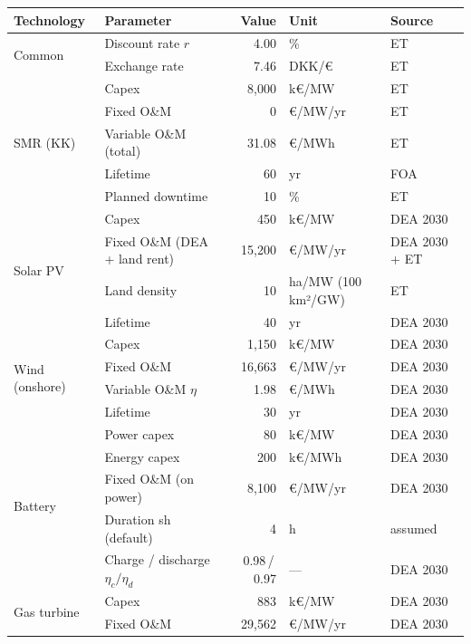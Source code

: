 \documentclass[10.5pt]{article}
\begin{document}
{\footnotesize
\begin{tabularx}{\linewidth}{l >{\raggedright\arraybackslash}X r l l}
\toprule
Technology & Parameter & Value & Unit & Source \\
\midrule
\multirow{2}{*}{Common}
  & Discount rate $r$     &  4.00 & \%      & ET \\
  & Exchange rate         &  7.46 & DKK/€   & ET \\
\midrule
\multirow{5}{*}{SMR (KK)}
  & Capex                 & 8{,}000 & k€/MW & ET \\
  & Fixed O\&M            &       0 & €/MW/yr & ET \\
  & Variable O\&M (total) &  31.08 & €/MWh  & ET \\
  & Lifetime              &     60 & yr     & FOA \\
  & Planned downtime      &     10 & \%     & ET \\
\midrule
\multirow{4}{*}{Solar PV}
  & Capex                 &    450 & k€/MW  & DEA 2030 \\
  & Fixed O\&M (DEA + land rent) & 15{,}200 & €/MW/yr & DEA 2030 + ET \\
  & Land density          &     10 & ha/MW (100\,km²/GW) & ET \\
  & Lifetime              &     40 & yr     & DEA 2030 \\
\midrule
\multirow{4}{*}{Wind (onshore)}
  & Capex                 & 1{,}150 & k€/MW & DEA 2030 \\
  & Fixed O\&M            & 16{,}663 & €/MW/yr & DEA 2030 \\
  & Variable O\&M $\eta$  &   1.98 & €/MWh  & DEA 2030 \\
  & Lifetime              &     30 & yr     & DEA 2030 \\
\midrule
\multirow{5}{*}{Battery}
  & Power capex           &     80 & k€/MW  & DEA 2030 \\
  & Energy capex          &    200 & k€/MWh & DEA 2030 \\
  & Fixed O\&M (on power) &  8{,}100 & €/MW/yr & DEA 2030 \\
  & Duration sh (default) &      4 & h      & assumed \\
  & Charge / discharge $\eta_c / \eta_d$ & 0.98\,/\,0.97 & — & DEA 2030 \\
\midrule
\multirow{5}{*}{Gas turbine}
  & Capex                 &    883 & k€/MW  & DEA 2030 \\
  & Fixed O\&M            & 29{,}562 & €/MW/yr & DEA 2030 \\

\end{tabularx}}
\end{document}
